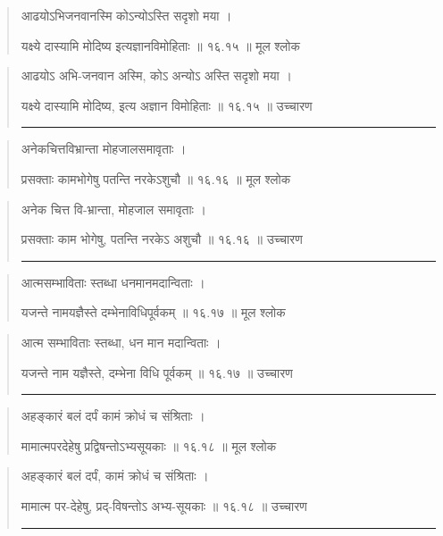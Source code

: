 \begin{quotation}

आढयोऽभिजनवानस्मि कोऽन्योऽस्ति सदृशो मया ।  

यक्ष्ये दास्यामि मोदिष्य इत्यज्ञानविमोहिताः  ॥ १६.१५ ॥  मूल श्लोक
\end{quotation}

\begin{quotation}

आढयोऽ अभि-जनवान अस्मि, कोऽ अन्योऽ अस्ति सदृशो मया ।  

यक्ष्ये दास्यामि मोदिष्य, इत्य अज्ञान विमोहिताः  ॥ १६.१५ ॥  उच्चारण

\noindent\rule{16cm}{0.4pt} 
\end{quotation}


\begin{quotation}

अनेकचित्तविभ्रान्ता मोहजालसमावृताः ।  

प्रसक्ताः कामभोगेषु पतन्ति नरकेऽशुचौ  ॥ १६.१६ ॥  मूल श्लोक
\end{quotation}

\begin{quotation}

अनेक चित्त वि-भ्रान्ता, मोहजाल समावृताः ।  

प्रसक्ताः काम भोगेषु, पतन्ति नरकेऽ अशुचौ  ॥ १६.१६ ॥  उच्चारण

\noindent\rule{16cm}{0.4pt} 
\end{quotation}


\begin{quotation}

आत्मसम्भाविताः स्तब्धा धनमानमदान्विताः ।  

यजन्ते नामयज्ञैस्ते दम्भेनाविधिपूर्वकम्‌  ॥ १६.१७ ॥  मूल श्लोक
\end{quotation}

\begin{quotation}

आत्म सम्भाविताः स्तब्धा, धन मान मदान्विताः ।  

यजन्ते नाम यज्ञैस्ते, दम्भेना विधि पूर्वकम्‌  ॥ १६.१७ ॥  उच्चारण

\noindent\rule{16cm}{0.4pt} 
\end{quotation}


\begin{quotation}
अहङ्‍कारं बलं दर्पं कामं क्रोधं च संश्रिताः ।  

मामात्मपरदेहेषु प्रद्विषन्तोऽभ्यसूयकाः  ॥ १६.१८ ॥  मूल श्लोक
\end{quotation}

\begin{quotation}

अहङ्‍कारं बलं दर्पं, कामं क्रोधं च संश्रिताः ।  

मामात्म पर-देहेषु, प्रद्-विषन्तोऽ अभ्य-सूयकाः  ॥ १६.१८ ॥  उच्चारण

\noindent\rule{16cm}{0.4pt} 
\end{quotation}


